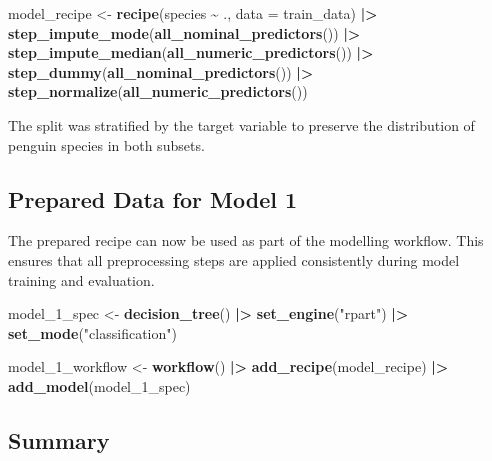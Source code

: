 \documentclass[
]{article}
\newenvironment{Shaded}{\begin{snugshade}}{\end{snugshade}}
\newcommand{\AttributeTok}[1]{\textcolor[rgb]{0.13,0.29,0.53}{#1}}
\newcommand{\FunctionTok}[1]{\textcolor[rgb]{0.13,0.29,0.53}{\textbf{#1}}}
\newcommand{\NormalTok}[1]{#1}
\newcommand{\OtherTok}[1]{\textcolor[rgb]{0.56,0.35,0.01}{#1}}
\newcommand{\SpecialCharTok}[1]{\textcolor[rgb]{0.81,0.36,0.00}{\textbf{#1}}}
\newcommand{\StringTok}[1]{\textcolor[rgb]{0.31,0.60,0.02}{#1}}
\begin{document}
\begin{Shaded}
\begin{Highlighting}[]
\NormalTok{model\_recipe }\OtherTok{\textless{}{-}} \FunctionTok{recipe}\NormalTok{(species }\SpecialCharTok{\textasciitilde{}}\NormalTok{ ., }\AttributeTok{data =}\NormalTok{ train\_data) }\SpecialCharTok{|\textgreater{}}
  \FunctionTok{step\_impute\_mode}\NormalTok{(}\FunctionTok{all\_nominal\_predictors}\NormalTok{()) }\SpecialCharTok{|\textgreater{}}
  \FunctionTok{step\_impute\_median}\NormalTok{(}\FunctionTok{all\_numeric\_predictors}\NormalTok{()) }\SpecialCharTok{|\textgreater{}}
  \FunctionTok{step\_dummy}\NormalTok{(}\FunctionTok{all\_nominal\_predictors}\NormalTok{()) }\SpecialCharTok{|\textgreater{}}
  \FunctionTok{step\_normalize}\NormalTok{(}\FunctionTok{all\_numeric\_predictors}\NormalTok{())}
\end{Highlighting}
\end{Shaded}

The split was stratified by the target variable to preserve the
distribution of penguin species in both subsets.

\subsection{Prepared Data for Model 1}\label{prepared-data-for-model-1}

The prepared recipe can now be used as part of the modelling workflow.
This ensures that all preprocessing steps are applied consistently
during model training and evaluation.

\begin{Shaded}
\begin{Highlighting}[]
\NormalTok{model\_1\_spec }\OtherTok{\textless{}{-}} \FunctionTok{decision\_tree}\NormalTok{() }\SpecialCharTok{|\textgreater{}}
  \FunctionTok{set\_engine}\NormalTok{(}\StringTok{"rpart"}\NormalTok{) }\SpecialCharTok{|\textgreater{}}
  \FunctionTok{set\_mode}\NormalTok{(}\StringTok{"classification"}\NormalTok{)}

\NormalTok{model\_1\_workflow }\OtherTok{\textless{}{-}} \FunctionTok{workflow}\NormalTok{() }\SpecialCharTok{|\textgreater{}}
  \FunctionTok{add\_recipe}\NormalTok{(model\_recipe) }\SpecialCharTok{|\textgreater{}}
  \FunctionTok{add\_model}\NormalTok{(model\_1\_spec)}
\end{Highlighting}
\end{Shaded}

\subsection{Summary}\label{summary}
\end{document}
